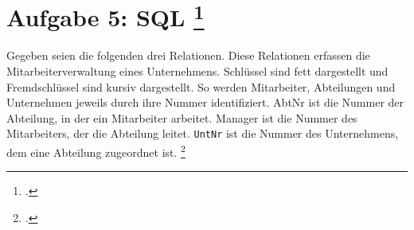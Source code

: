 \documentclass{lehramt-informatik-aufgabe}
\begin{document}

\section{Aufgabe 5: SQL
\footcite[Thema 1 Aufgabe 5]{66113:2003:03}}

Gegeben seien die folgenden drei Relationen. Diese Relationen erfassen
die Mitarbeiterverwaltung eines Unternehmens. Schlüssel sind fett
dargestellt und Fremdschlüssel sind kursiv dargestellt. So werden
Mitarbeiter, Abteilungen und Unternehmen jeweils durch ihre Nummer
identifiziert. AbtNr ist die Nummer der Abteilung, in der ein
Mitarbeiter arbeitet. Manager ist die Nummer des Mitarbeiters, der die
Abteilung leitet. \verb|UntNr| ist die Nummer des Unternehmens, dem eine
Abteilung zugeordnet ist.
\footcite[Aufgabe 2: SQL]{db:pu:2}
\end{document}
